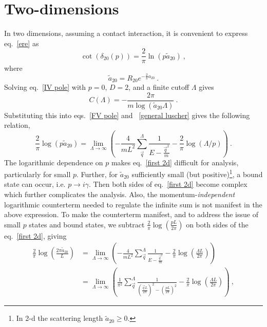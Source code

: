 \section{Two-dimensions}
In two dimensions, assuming a contact interaction, it is convenient to express eq.~\eqref{ere} as
\begin{equation}
\cot \left(\delta_{20}(p)\right)=\frac{2}{\pi}  \ln \left(p \tilde a_{20}\right)\ ,
\end{equation}
where
\begin{equation}
\tilde a_{20}=R_{20}e^{-\frac{2}{\pi}a_{20}}\ .
\end{equation}
Solving eq.~\eqref{IV pole} with $p=0$, $D=2$, and a finite cutoff $\Lambda$ gives
\begin{equation}\label{eq:C2}
C(\Lambda)=-\frac{2 \pi}{m \log \left(\tilde a_{20} \Lambda\right)}\ .
\end{equation}
Substituting this into eqs.~\eqref{FV pole} and ~\eqref{general luscher} gives the following relation,
\begin{equation}\label{eq:first 2d}
\frac{2}{\pi} \log \left(p\tilde a_{20}\right)=\lim_{\Lambda\to\infty}\left(-\frac{4}{m L^{2}} \sum_{\vec{q}}^{\Lambda} \frac{1}{E-\frac{\vec{q}^{2}}{m}}-\frac{2}{\pi} \log (\Lambda / p)\right)\ .
\end{equation}
The logarithmic dependence on $p$ makes eq.~\eqref{first 2d} difficult for analysis, particularly for small $p$.  Further, for $\tilde a_{20}$ sufficiently small (but positive)\footnote{ In 2-d the scattering length $\tilde a_{20}\ge 0$\cite{}.}, a bound state can occur, i.e. $p\to i\gamma$.  Then both sides of eq.~\eqref{first 2d} become complex which further complicates the analysis.   Also, the momentum-\emph{independent} logarithmic counterterm needed to regulate the infinite sum is not manifest in the above expression.  To make the counterterm manifest, and to address the issue of small $p$ states and bound states, we subtract $\frac{2}{\pi}\log\left(\frac{pL}{2\pi}\right)$ on both sides of the eq.~\eqref{first 2d}, giving
\begin{align}
\frac{2}{\pi} \log \left(\frac{2\pi \tilde a_{20}}{L}\right)&=\lim_{\Lambda\to\infty}\left(-\frac{4}{m L^{2}} \sum_{\vec{q}}^{\Lambda} \frac{1}{E-\frac{\vec{q}^{2}}{m}}-\frac{2}{\pi} \log \left(\frac{\Lambda L}{2\pi}\right)\right)\nonumber\\
&=\lim_{\Lambda\to\infty}\left(\frac{1}{\pi^2} \sum_{\vec{q}}^{\Lambda} \frac{1}{\left(\frac{\vec{q}L}{2\pi}\right)^2-\left(\frac{pL}{2\pi}\right)^2}-\frac{2}{\pi} \log \left(\frac{\Lambda L}{2\pi}\right)\right)\ ,\label{eq:second 2d}
\end{align}
